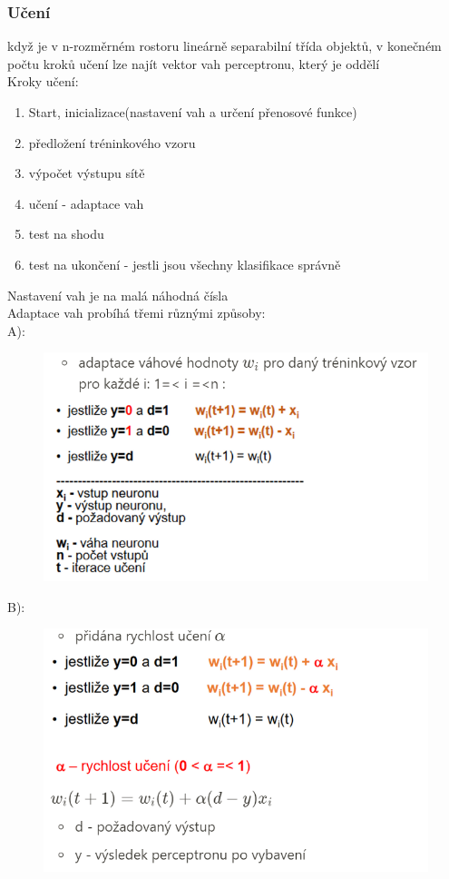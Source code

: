 \subsubsection*{Učení}
když je v n-rozměrném rostoru lineárně separabilní třída objektů, v konečném počtu kroků učení lze najít vektor vah perceptronu, který je oddělí\\
Kroky učení:
\begin{enumerate}
    \item Start, inicializace(nastavení vah a určení přenosové funkce)
    \item předložení tréninkového vzoru
    \item výpočet výstupu sítě
    \item učení - adaptace vah
    \item test na shodu
    \item test na ukončení - jestli jsou všechny klasifikace správně
\end{enumerate}
Nastavení vah je na malá náhodná čísla\\
Adaptace vah probíhá třemi různými způsoby:\\
A):
\begin{figure}[H]
    \includegraphics[scale = 1]{images/perceptron_vahy1.png}
\end{figure}
\newpage
B):
\begin{figure}[H]
    \includegraphics[scale = 1]{images/perceptron_vahy2.png}
\end{figure}
